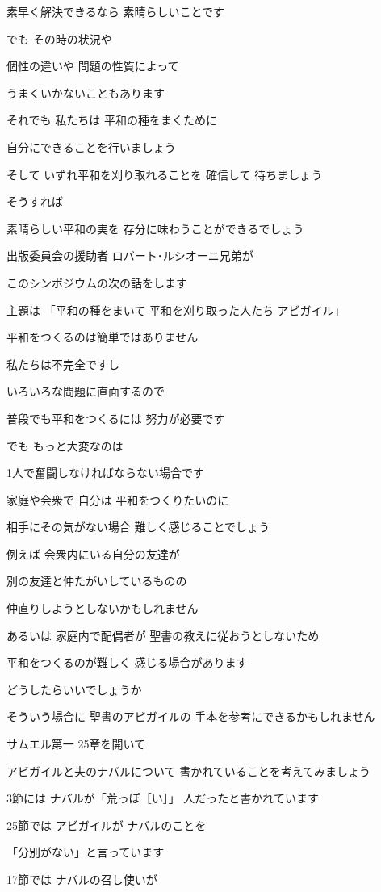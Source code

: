 \documentclass[twocolumn]{jsarticle}
\begin{document}
素早く解決できるなら
素晴らしいことです

でも その時の状況や

個性の違いや 問題の性質によって

うまくいかないこともあります

それでも 私たちは
平和の種をまくために

自分にできることを行いましょう

そして いずれ平和を刈り取れることを
確信して 待ちましょう

そうすれば

素晴らしい平和の実を
存分に味わうことができるでしょう

出版委員会の援助者
ロバート･ルシオーニ兄弟が

このシンポジウムの次の話をします

主題は 「平和の種をまいて
平和を刈り取った人たち アビガイル」

平和をつくるのは簡単ではありません

私たちは不完全ですし

いろいろな問題に直面するので

普段でも平和をつくるには
努力が必要です

でも もっと大変なのは

1人で奮闘しなければならない場合です

家庭や会衆で 自分は
平和をつくりたいのに

相手にその気がない場合
難しく感じることでしょう

例えば 会衆内にいる自分の友達が

別の友達と仲たがいしているものの

仲直りしようとしないかもしれません

あるいは 家庭内で配偶者が
聖書の教えに従おうとしないため

平和をつくるのが難しく
感じる場合があります

どうしたらいいでしょうか

そういう場合に 聖書のアビガイルの
手本を参考にできるかもしれません

サムエル第一 25章を開いて

アビガイルと夫のナバルについて
書かれていることを考えてみましょう

3節には ナバルが「荒っぽ［い］」
人だったと書かれています

25節では アビガイルが
ナバルのことを

「分別がない」と言っています

17節では ナバルの召し使いが
\end{document}
